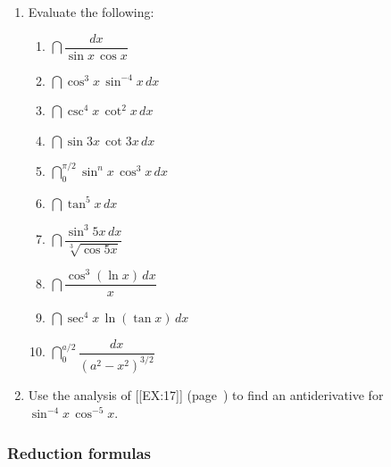 \begin{enumerate}
\begin{enumerate}
\end{enumerate}
\item Evaluate the following:



  \begin{enumerate}
  \item $\dint \dfrac{dx}{\sin{x}\,\cos{x}}$


  \item $\dint \cos^3{x}\,\sin^{-4}{x}\,dx$


  \item $\dint \csc^4{x}\,\cot^2{x}\,dx$


  \item $\dint \sin{3x}\,\cot{3x}\,dx$


  \item $\dint_0^{\pi/2} \sin^n{x}\,\cos^3{x}\,dx$

  \item $\dint \tan^5{x}\,dx$


  \item $\dint \dfrac{\sin^3{5x}\,dx}{\sqrt[3]{\cos{5x}}}$


  \item $\dint \dfrac{\cos^3(\ln{x})\,dx}{x}$


  \item $\dint \sec^4{x}\,\ln(\tan{x})\,dx$


  \item $\dint_0^{a/2} \dfrac{dx}{(a^2-x^2)^{3/2}}$
\mbox{}


\end{enumerate}
\item Use the analysis of [[EX:17]] (page~\pageref{ex17}) to find an
antiderivative for $\sin^{-4}{x}\,\cos^{-5}{x}$.

\end{enumerate}
\subsubsection{Reduction formulas}
\label{subsubsec:reduction-formulas}



